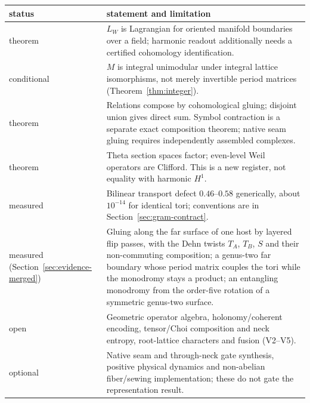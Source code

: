 \documentclass[11pt]{article}
\theoremstyle{definition}
\theoremstyle{remark}
\begin{document}
\begin{center}
\begin{tabular}{@{}>{\raggedright\arraybackslash}p{}>{\raggedright\arraybackslash}p{}@{}}
\toprule
status & statement and limitation \\
\midrule
theorem & $L_W$ is Lagrangian for oriented manifold boundaries over a field;
harmonic readout additionally needs a certified cohomology identification.\\
conditional & $M$ is integral unimodular under integral lattice isomorphisms,
not merely invertible period matrices (Theorem~\ref{thm:integer}).\\
theorem & Relations compose by cohomological gluing; disjoint union gives
direct sum. Symbol contraction is a separate exact composition theorem;
native seam gluing requires independently assembled complexes.\\
theorem & Theta section spaces factor; even-level Weil operators are
Clifford. This is a new register, not equality with harmonic $H^1$.\\
measured & Bilinear transport defect $0.46$--$0.58$ generically, about
$10^{-14}$ for identical tori; conventions are in Section~\ref{sec:gram-contract}.\\
measured (Section~\ref{sec:evidence-merged}) & Gluing along the far surface
of one host by layered flip passes, with the Dehn twists $T_A$, $T_B$, $S$
and their non-commuting composition; a genus-two far boundary whose period
matrix couples the tori while the monodromy stays a product; an entangling
monodromy from the order-five rotation of a symmetric genus-two surface.\\
open & Geometric operator algebra, holonomy/coherent encoding, tensor/Choi
composition and neck entropy, root-lattice characters and fusion
(V2--V5).\\
optional & Native seam and through-neck gate synthesis, positive physical
dynamics and non-abelian fiber/sewing implementation; these do not gate
the representation result.\\
\bottomrule
\end{tabular}
\end{center}
\end{document}
